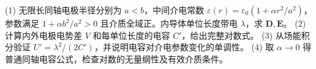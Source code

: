 (1) 无限长同轴电极半径分别为 \(a<b\)，中间介电常数 \(\varepsilon(r)=\varepsilon_0(1+\alpha r^2/a^2)\)，参数满足 \(1+\alpha b^2/a^2>0\) 且介质全域正。内导体单位长度带电 \(\lambda\)，求 \(\mathbf D,\mathbf E\)。
(2) 计算内外电极电势差 \(V\) 和每单位长度的电容 \(C'\)，给出完整对数式。
(3) 从场能积分验证 \(U'=\lambda^2/(2C')\)，并说明电容对介电参数变化的单调性。
(4) 取 \(\alpha\to0\) 得普通同轴电容公式，检查对数的无量纲性及有效介质条件。
